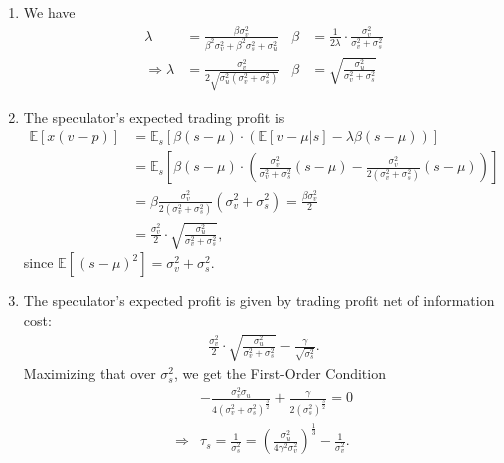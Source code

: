 \documentclass[a4paper]{article}
\begin{document}
\begin{enumerate}
	\item We have
	\begin{align*}
		\lambda &= \frac{\beta \sigma^2_v}{\beta^2 \sigma^2_v + \beta^2\sigma^2_s + \sigma^2_u}
		&
		\beta &= \frac{1}{2\lambda} \cdot \frac{\sigma^2_v}{\sigma^2_v + \sigma^2_s}
		\\
		\Rightarrow
		\lambda &= \frac{\sigma^2_v}{2 \sqrt{ \sigma^2_u (\sigma^2_v + \sigma^2_s) }}
		&
		\beta &= \sqrt{ \frac{\sigma^2_u}{\sigma^2_v + \sigma^2_s} }
	\end{align*}
	
	\item The speculator's expected trading profit is
	\begin{align*}
		\mathbb{E} [x(v-p) ] 
		&= \mathbb{E}_s \left[ \beta (s-\mu) \cdot \left( \mathbb{E}[v - \mu|s] - \lambda \beta (s-\mu) \right) \right]
		\\
		&= \mathbb{E}_s \left[ \beta (s-\mu) \cdot \left( \frac{\sigma^2_v}{\sigma^2_v + \sigma^2_s} (s-\mu) - \frac{\sigma^2_v}{2 (\sigma^2_v + \sigma^2_s) } (s-\mu) \right) \right]
		\\
		&= \beta \frac{\sigma^2_v}{2(\sigma^2_v + \sigma^2_s)} (\sigma^2_v + \sigma^2_s)
		= \frac{\beta \sigma^2_v}{2}
		\\
		&= \frac{\sigma^2_v}{2} \cdot \sqrt{ \frac{\sigma^2_u}{\sigma^2_v + \sigma^2_s} },
	\end{align*}
	since $\mathbb{E}[(s-\mu)^2] = \sigma^2_v + \sigma^2_s$.
	
	\item The speculator's expected profit is given by trading profit net of information cost:
	\begin{align*}
		\frac{\sigma^2_v}{2} \cdot \sqrt{ \frac{\sigma^2_u}{\sigma^2_v + \sigma^2_s} } - \frac{\gamma}{\sqrt{\sigma^2_s}}.
	\end{align*}
	Maximizing that over $\sigma^2_s$, we get the First-Order Condition
	\begin{align*}
		&-\frac{\sigma^2_v \sigma_u}{4 (\sigma^2_v + \sigma^2_s)^{\frac{3}{2}}} + \frac{\gamma}{2(\sigma^2_s)^{\frac{3}{2}}} = 0
		\\ \Rightarrow 
		&\tau_s = \frac{1}{\sigma^2_s} = \left( \frac{\sigma^2_u}{4\gamma^2 \sigma^2_v} \right)^{\frac{1}{3}} - \frac{1}{\sigma^2_v}.
	\end{align*}
	

\end{enumerate}
\end{document}
